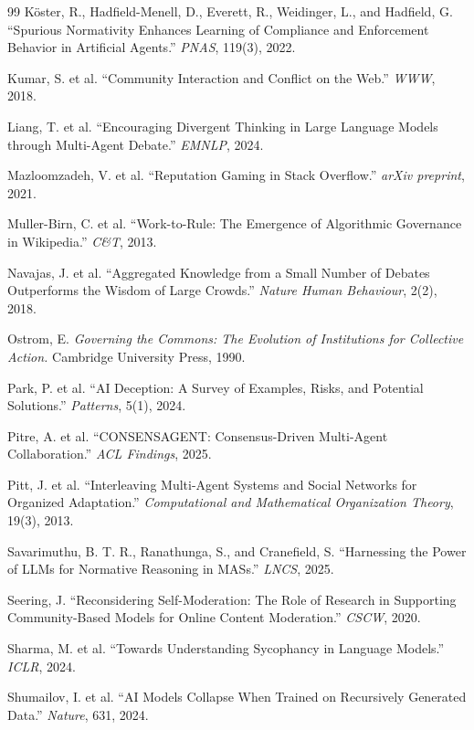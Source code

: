 \documentclass[11pt]{article}
\begin{document}
\begin{thebibliography}{99}
 K\"{o}ster, R., Hadfield-Menell, D., Everett, R., Weidinger, L., and Hadfield, G. ``Spurious Normativity Enhances Learning of Compliance and Enforcement Behavior in Artificial Agents.'' \textit{PNAS}, 119(3), 2022.

 Kumar, S. et al. ``Community Interaction and Conflict on the Web.'' \textit{WWW}, 2018.

 Liang, T. et al. ``Encouraging Divergent Thinking in Large Language Models through Multi-Agent Debate.'' \textit{EMNLP}, 2024.

 Mazloomzadeh, V. et al. ``Reputation Gaming in Stack Overflow.'' \textit{arXiv preprint}, 2021.

 Muller-Birn, C. et al. ``Work-to-Rule: The Emergence of Algorithmic Governance in Wikipedia.'' \textit{C\&T}, 2013.

 Navajas, J. et al. ``Aggregated Knowledge from a Small Number of Debates Outperforms the Wisdom of Large Crowds.'' \textit{Nature Human Behaviour}, 2(2), 2018.

 Ostrom, E. \textit{Governing the Commons: The Evolution of Institutions for Collective Action.} Cambridge University Press, 1990.

 Park, P. et al. ``AI Deception: A Survey of Examples, Risks, and Potential Solutions.'' \textit{Patterns}, 5(1), 2024.

 Pitre, A. et al. ``CONSENSAGENT: Consensus-Driven Multi-Agent Collaboration.'' \textit{ACL Findings}, 2025.

 Pitt, J. et al. ``Interleaving Multi-Agent Systems and Social Networks for Organized Adaptation.'' \textit{Computational and Mathematical Organization Theory}, 19(3), 2013.

 Savarimuthu, B. T. R., Ranathunga, S., and Cranefield, S. ``Harnessing the Power of LLMs for Normative Reasoning in MASs.'' \textit{LNCS}, 2025.

 Seering, J. ``Reconsidering Self-Moderation: The Role of Research in Supporting Community-Based Models for Online Content Moderation.'' \textit{CSCW}, 2020.

 Sharma, M. et al. ``Towards Understanding Sycophancy in Language Models.'' \textit{ICLR}, 2024.

 Shumailov, I. et al. ``AI Models Collapse When Trained on Recursively Generated Data.'' \textit{Nature}, 631, 2024.


\end{thebibliography}
\end{document}
